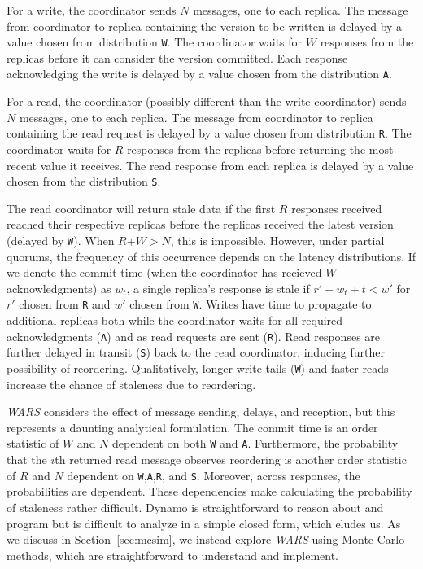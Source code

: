 \documentclass{vldb}
\begin{document}
For a write, the coordinator sends $N$ messages, one to each
replica. The message from coordinator to replica containing the
version to be written is delayed by a value chosen from distribution
\texttt{W}.  The coordinator waits for $W$ responses from the replicas
before it can consider the version committed.  Each response
acknowledging the write is delayed by a value chosen from the
distribution \texttt{A}.

For a read, the coordinator (possibly different than the write
coordinator) sends $N$ messages, one to each replica.  The message
from coordinator to replica containing the read request is delayed by
a value chosen from distribution \texttt{R}.  The coordinator waits
for $R$ responses from the replicas before returning the most recent
value it receives.  The read response from each replica is delayed by
a value chosen from the distribution \texttt{S}.

The read coordinator will return stale data if the first $R$ responses
received reached their respective replicas before the replicas
received the latest version (delayed by \texttt{W}).  When
$R$$+$$W$$>$$N$, this is impossible.  However, under partial quorums,
the frequency of this occurrence depends on the latency distributions.
If we denote the commit time (when the coordinator has recieved $W$
acknowledgments) as $w_t$, a single replica's response is stale if
$r'+w_t+t< w'$ for $r'$ chosen from \texttt{R} and $w'$ chosen from
\texttt{W}.  Writes have time to propagate to additional replicas both
while the coordinator waits for all required acknowledgments
(\texttt{A}) and as read requests are sent (\texttt{R}).  Read
responses are further delayed in transit (\texttt{S}) back to the read
coordinator, inducing further possibility of reordering.
Qualitatively, longer write tails (\texttt{W}) and faster reads
increase the chance of staleness due to reordering.

\textit{WARS} considers the effect of message sending, delays, and
reception, but this represents a daunting analytical formulation.  The
commit time is an order statistic of $W$ and $N$ dependent on both
\texttt{W} and \texttt{A}.  Furthermore, the probability that the
$i$th returned read message observes reordering is another order
statistic of $R$ and $N$ dependent on
\texttt{W},\texttt{A},\texttt{R}, and \texttt{S}.  Moreover, across
responses, the probabilities are dependent. These dependencies make
calculating the probability of staleness rather difficult.  Dynamo is
straightforward to reason about and program but is difficult to
analyze in a simple closed form, which eludes us.  As we discuss in
Section~\ref{sec:mcsim}, we instead explore \textit{WARS} using Monte
Carlo methods, which are straightforward to understand and implement.
\end{document}
